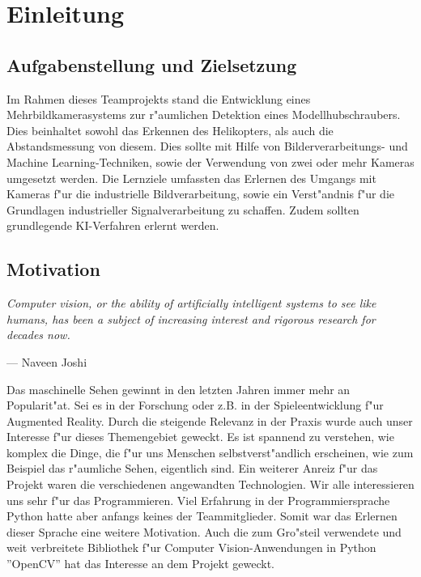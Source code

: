 \chapter{Einleitung}
\label{cha:einleitung}

\section{Aufgabenstellung und Zielsetzung}
\label {sec:aufgabenstellungzielsetzung}

Im Rahmen dieses Teamprojekts stand die Entwicklung eines Mehrbildkamerasystems zur r"aumlichen Detektion eines Modellhubschraubers. Dies beinhaltet sowohl das Erkennen des Helikopters, als auch die Abstandsmessung von diesem. Dies sollte mit Hilfe von Bilderverarbeitungs- und Machine Learning-Techniken, sowie der Verwendung von zwei oder mehr Kameras umgesetzt werden.\newline
Die Lernziele umfassten das Erlernen des Umgangs mit Kameras f"ur die industrielle Bildverarbeitung, sowie ein Verst"andnis f"ur die Grundlagen industrieller Signalverarbeitung zu schaffen. Zudem sollten grundlegende KI-Verfahren erlernt werden.

\section{Motivation}
\label {sec:motivation}

\setlength\epigraphwidth{15cm}
\setlength\epigraphrule{0pt}

\epigraph{\textit{\glqq Computer vision, or the ability of artificially intelligent systems to see like humans, has been a subject of increasing interest and rigorous research for decades now.\grqq{}}}{--- \textup{}Naveen Joshi\cite{NJ}\\}

\noindent Das maschinelle Sehen gewinnt in den letzten Jahren immer mehr an Popularit"at. Sei es in der Forschung oder z.B. in der Spieleentwicklung f"ur Augmented Reality. Durch die steigende Relevanz in der Praxis wurde auch unser Interesse f"ur dieses Themengebiet geweckt. Es ist spannend zu verstehen, wie komplex die Dinge, die f"ur uns Menschen selbstverst"andlich erscheinen, wie zum Beispiel das r"aumliche Sehen, eigentlich sind.
Ein weiterer Anreiz f"ur das Projekt waren die verschiedenen angewandten Technologien. Wir alle interessieren uns sehr f"ur das Programmieren. Viel Erfahrung in der Programmiersprache Python hatte aber anfangs keines der Teammitglieder. Somit war das Erlernen dieser Sprache eine weitere Motivation.\newline
Auch die zum Gro"steil verwendete und weit verbreitete Bibliothek f"ur Computer Vision-Anwendungen in Python ''OpenCV'' hat das Interesse an dem Projekt geweckt.

